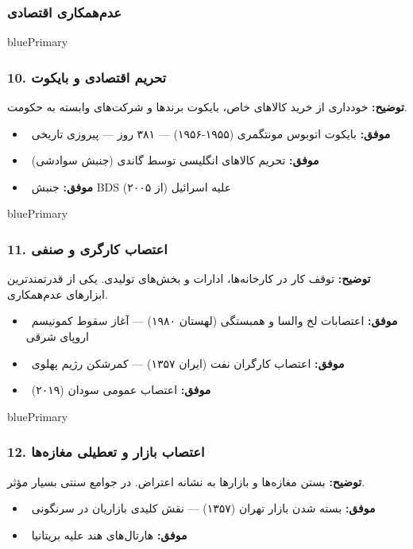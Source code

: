 \documentclass[a4paper,12pt]{article}
\newcommand{\success}[1]{\textcolor{greenPrimary}{\faCheckCircle\ \textbf{موفق:}} #1}
\newcommand{\methodnum}[1]{\textcolor{purpleLight}{\textbf{#1.}}}
\begin{document}
\subsubsection*{عدم‌همکاری اقتصادی}

\begin{methodcard}{bluePrimary}
\subsubsection{\methodnum{10} تحریم اقتصادی و بایکوت}
\textbf{توضیح:} خودداری از خرید کالاهای خاص، بایکوت برندها و شرکت‌های وابسته به حکومت.

\begin{itemize}[label=\textcolor{greenPrimary}{\faCheckCircle}]
  \item \success{بایکوت اتوبوس مونتگمری (۱۹۵۵-۱۹۵۶) — ۳۸۱ روز — پیروزی تاریخی}
  \item \success{تحریم کالاهای انگلیسی توسط گاندی (جنبش سوادشی)}
  \item \success{جنبش BDS علیه اسرائیل (از ۲۰۰۵)}
\end{itemize}
\end{methodcard}

\begin{methodcard}{bluePrimary}
\subsubsection{\methodnum{11} اعتصاب کارگری و صنفی}
\textbf{توضیح:} توقف کار در کارخانه‌ها، ادارات و بخش‌های تولیدی. یکی از قدرتمندترین ابزارهای عدم‌همکاری.

\begin{itemize}[label=\textcolor{greenPrimary}{\faCheckCircle}]
  \item \success{اعتصابات لخ والسا و همبستگی (لهستان ۱۹۸۰) — آغاز سقوط کمونیسم اروپای شرقی}
  \item \success{اعتصاب کارگران نفت (ایران ۱۳۵۷) — کمرشکن رژیم پهلوی}
  \item \success{اعتصاب عمومی سودان (۲۰۱۹)}
\end{itemize}
\end{methodcard}

\begin{methodcard}{bluePrimary}
\subsubsection{\methodnum{12} اعتصاب بازار و تعطیلی مغازه‌ها}
\textbf{توضیح:} بستن مغازه‌ها و بازارها به نشانه اعتراض. در جوامع سنتی بسیار مؤثر.

\begin{itemize}[label=\textcolor{greenPrimary}{\faCheckCircle}]
  \item \success{بسته شدن بازار تهران (۱۳۵۷) — نقش کلیدی بازاریان در سرنگونی}
  \item \success{هارتال‌های هند علیه بریتانیا}
\end{itemize}
\end{methodcard}
\end{document}
